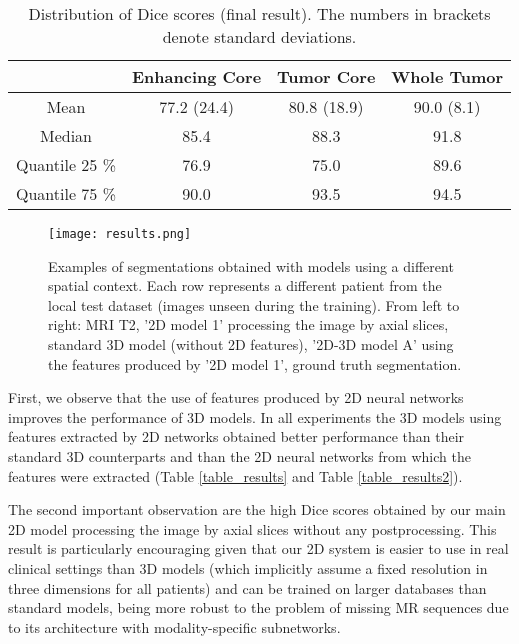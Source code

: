 \documentclass[preprint,12pt]{elsarticle}
\begin{document}
\begin{table}[ht!]
\centering
\caption{Distribution of Dice scores (final result). The numbers in brackets denote standard deviations.}
\begin{tabular}{|c|c|c|c|}
  \hline
& \scriptsize{Enhancing Core}& \scriptsize{Tumor Core}& \scriptsize{Whole Tumor}\\ 
  \hline
\scriptsize{Mean}& \scriptsize{ 77.2 (24.4)   }& \scriptsize{ 80.8 (18.9) }& \scriptsize{   90.0 (8.1)  }\\ 
\hline
\scriptsize{Median }& \scriptsize{ 85.4   }& \scriptsize{ 88.3}& \scriptsize{  91.8   }\\ 
  \hline
\scriptsize{Quantile 25 \%   }& \scriptsize{ 76.9 }& \scriptsize{  75.0 }& \scriptsize{    89.6 }\\ 
  \hline
\scriptsize{Quantile 75 \%      }& \scriptsize{ 90.0 }& \scriptsize{ 93.5 }& \scriptsize{   94.5  }\\ 
  \hline

\end{tabular}
\label{table_stats}
\end{table}










\begin{figure*}[ht!]
\centering
\texttt{[image: results.png]}
\caption{
Examples of segmentations obtained with models using a different spatial context. Each row represents a different patient from the local test dataset (images unseen during the training). From left to right: MRI T2, '2D model 1' processing the image by axial slices, standard 3D model (without 2D features), '2D-3D model A' using the features produced by '2D model 1', ground truth segmentation.}
\label{fig_results}
\end{figure*}



First, we observe that the use of features produced by 2D neural networks improves the performance of 3D models. In all experiments the 3D models using features extracted by 2D networks obtained better performance than their standard 3D counterparts and than the 2D neural networks from which the features were extracted (Table \ref{table_results} and Table \ref{table_results2}). 

The second important observation are the high Dice scores obtained by our main 2D model processing the image by axial slices without any postprocessing. This result is particularly encouraging given that our 2D system is easier to use in real clinical settings than 3D models (which implicitly assume a fixed resolution in three dimensions for all patients) and can be trained on larger databases than standard models, being more robust to the problem of missing MR sequences due to its architecture with modality-specific subnetworks.
\end{document}
